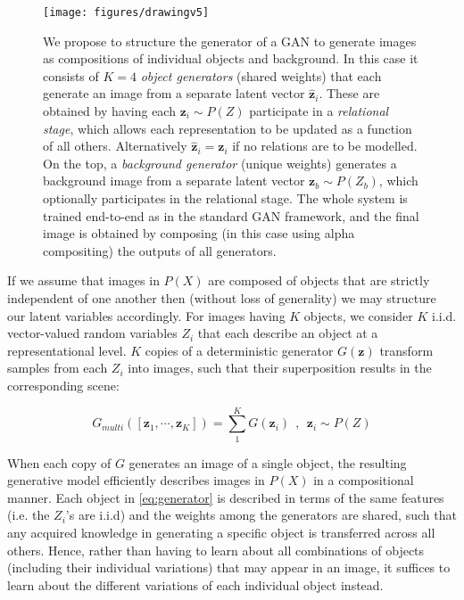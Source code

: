 \documentclass{article}
\begin{document}
\begin{figure}
    \centering
    \texttt{[image: figures/drawingv5]}
    \caption{We propose to structure the generator of a GAN to generate images as compositions of individual objects and background. In this case it consists of $K=4$ \emph{object generators} (shared weights) that each generate an image from a separate latent vector $\bm{\hat{z}}_i$. These are obtained by having each $\bm{z}_i \sim P(Z)$ participate in a \emph{relational stage}, which allows each representation to be updated as a function of all others. Alternatively $\bm{\hat{z}}_i=\bm{z}_i$ if no relations are to be modelled. On the top, a \emph{background generator} (unique weights) generates a background image from a separate latent vector $\bm{z}_b \sim P(Z_b)$, which optionally participates in the relational stage. The whole system is trained end-to-end as in the standard GAN framework, and the final image is obtained by composing (in this case using alpha compositing) the outputs of all generators.}
    \label{fig:drawing}
\end{figure}%

If we assume that images in $P(X)$ are composed of objects that are strictly independent of one another then (without loss of generality) we may structure our latent variables accordingly.
For images having $K$ objects, we consider $K$ i.i.d. vector-valued random variables $Z_{i}$ that each describe an object at a representational level.
$K$ copies of a deterministic generator $G(\bm{z})$ transform samples from each $Z_{i}$ into images, such that their superposition results in the corresponding scene:

\begin{equation}
G_{multi}([\bm{z}_1, \cdots, \bm{z}_K]) = \sum_1^K G(\bm{z}_i) \ \ , \ \ \bm{z}_i \sim P(Z)
\label{eq:generator}
\end{equation}

When each copy of $G$ generates an image of a single object, the resulting generative model efficiently describes images in $P(X)$ in a compositional manner.
Each object in \eqref{eq:generator} is described in terms of the same features (i.e. the $Z_i$'s are i.i.d) and the weights among the generators are shared, such that any acquired knowledge in generating a specific object is transferred across all others.
Hence, rather than having to learn about all combinations of objects (including their individual variations) that may appear in an image, it suffices to learn about the different variations of each individual object instead.
\end{document}
